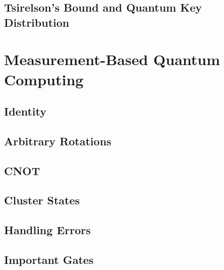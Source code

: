 	\section{Tsirelson's Bound and Quantum Key Distribution} %

\chapter{Measurement-Based Quantum Computing} %

	\section{Identity} %

	\section{Arbitrary Rotations} %

	\section{CNOT} %

	\section{Cluster States} %

	\section{Handling Errors} %

	\section{Important Gates} %
